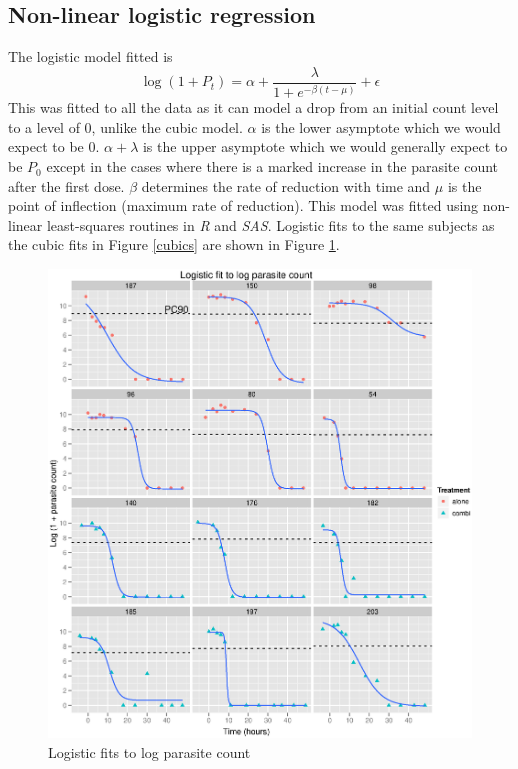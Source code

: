 \subsection{Non-linear logistic regression}
The logistic model fitted is
$$\log(1+P_t)=\alpha+\frac{\lambda}{1+e^{-\beta(t-\mu)}}+\epsilon$$
This was fitted to all the data as it can model a drop from an initial count level to a level of 0, unlike the cubic model. $\alpha$ is the lower asymptote which we would expect to be 0. $\alpha+\lambda$ is the upper asymptote which we would generally expect to be $P_0$ except in the cases where there is a marked increase in the parasite count after the first dose. $\beta$ determines the rate of reduction with time and $\mu$ is the point of inflection (maximum rate of reduction). This model was fitted using non-linear least-squares routines in \emph{R} and \emph{SAS}. Logistic fits to the same subjects as the cubic fits in Figure \ref{cubics} are shown in Figure \ref{logistics}.
\begin{figure}[h]
\includegraphics[width=6.1in]{logistics.eps} 
\caption{Logistic fits to log parasite count}\label{logistics}
\end{figure}
\clearpage
